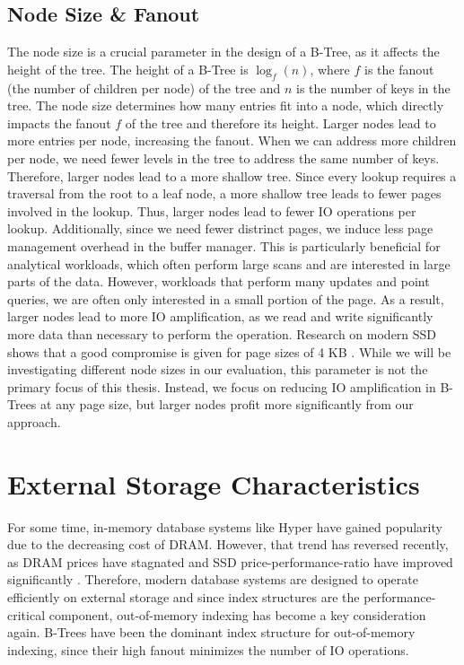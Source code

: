 
\subsection*{Node Size \& Fanout}
\label{sec:node-size-fanout}
The node size is a crucial parameter in the design of a B-Tree, as it affects the height of the tree.
The height of a B-Tree is $\log_f(n)$, where $f$ is the fanout (the number of children per node) of the tree and $n$ is the number of keys in the tree.
The node size determines how many entries fit into a node, which directly impacts the fanout $f$ of the tree and therefore its height.
Larger nodes lead to more entries per node, increasing the fanout. 
When we can address more children per node, we need fewer levels in the tree to address the same number of keys.
Therefore, larger nodes lead to a more shallow tree. 
Since every lookup requires a traversal from the root to a leaf node, a more shallow tree leads to fewer pages involved in the lookup.
Thus, larger nodes lead to fewer \ac{IO} operations per lookup.
Additionally, since we need fewer distrinct pages, we induce less page management overhead in the buffer manager.
This is particularly beneficial for analytical workloads, which often perform large scans and are interested in large parts of the data.
However, workloads that perform many updates and point queries, we are often only interested in a small portion of the page.
As a result, larger nodes lead to more \ac{IO} amplification, as we read and write significantly more data than necessary to perform the operation.
Research on modern \ac{SSD} shows that a good compromise is given for page sizes of 4 KB \cite{haas2023modern}.
While we will be investigating different node sizes in our evaluation, this parameter is not the primary focus of this thesis.
Instead, we focus on reducing \ac{IO} amplification in B-Trees at any page size, but larger nodes profit more significantly from our approach.

\section{External Storage Characteristics}
For some time, in-memory database systems like Hyper \cite{kemper2011hyper} have gained popularity due to the decreasing cost of \ac{DRAM}.
However, that trend has reversed recently, as \ac{DRAM} prices have stagnated \cite{haas2023modern} and \ac{SSD} price-performance-ratio have improved significantly \cite{leis2024leanstore}.
Therefore, modern database systems are designed to operate efficiently on external storage and since index structures are the performance-critical component, out-of-memory indexing has become a key consideration again.
B-Trees have been the dominant index structure for out-of-memory indexing, since their high fanout minimizes the number of \ac{IO} operations.

